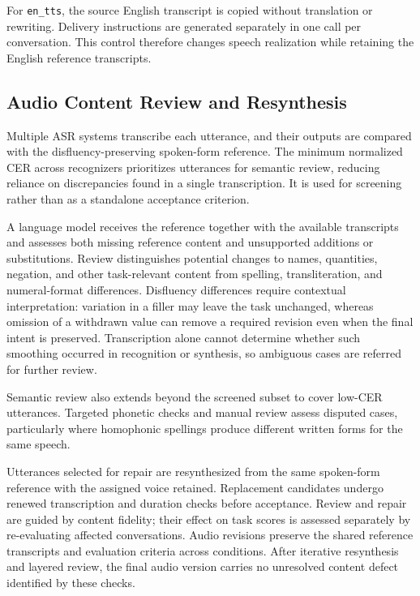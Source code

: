 \documentclass{article}
\begin{document}
For \texttt{en\_tts}, the source English transcript is copied without translation or rewriting. Delivery instructions are generated separately in one call per conversation. This control therefore changes speech realization while retaining the English reference transcripts.

\subsection{Audio Content Review and Resynthesis}

Multiple ASR systems transcribe each utterance, and their outputs are compared with the disfluency-preserving spoken-form reference. The minimum normalized CER across recognizers prioritizes utterances for semantic review, reducing reliance on discrepancies found in a single transcription. It is used for screening rather than as a standalone acceptance criterion.

A language model receives the reference together with the available transcripts and assesses both missing reference content and unsupported additions or substitutions. Review distinguishes potential changes to names, quantities, negation, and other task-relevant content from spelling, transliteration, and numeral-format differences. Disfluency differences require contextual interpretation: variation in a filler may leave the task unchanged, whereas omission of a withdrawn value can remove a required revision even when the final intent is preserved. Transcription alone cannot determine whether such smoothing occurred in recognition or synthesis, so ambiguous cases are referred for further review.

Semantic review also extends beyond the screened subset to cover low-CER utterances. Targeted phonetic checks and manual review assess disputed cases, particularly where homophonic spellings produce different written forms for the same speech.

Utterances selected for repair are resynthesized from the same spoken-form reference with the assigned voice retained. Replacement candidates undergo renewed transcription and duration checks before acceptance. Review and repair are guided by content fidelity; their effect on task scores is assessed separately by re-evaluating affected conversations. Audio revisions preserve the shared reference transcripts and evaluation criteria across conditions. After iterative resynthesis and layered review, the final audio version carries no unresolved content defect identified by these checks.
\end{document}
